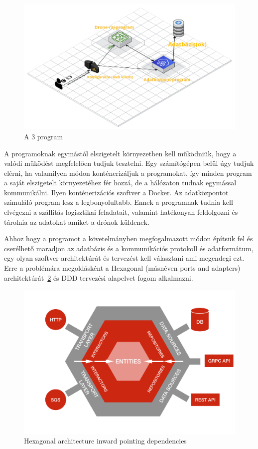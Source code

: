 \begin{figure}[h]
    \centering
    \includegraphics[scale=0.22]{images/szakdolgozat-3-program-abra.png}
    \caption{A 3 program}
    \label{fig:3program}
\end{figure}
A programoknak egymástól elszigetelt környezetben kell működniük, hogy a valódi működést megfelelően tudjuk tesztelni.
Egy számítógépen belül úgy tudjuk elérni, ha valamilyen módon konténerizáljuk a programokat, így minden program a saját elszigetelt környezetéhez fér hozzá, de a hálózaton tudnak egymással kommunikálni.
Ilyen konténerizációs szoftver a Docker.
Az adatközpontot szimuláló program lesz a legbonyolultabb.
Ennek a programnak tudnia kell elvégezni a szállítás logisztikai feladatait, valamint hatékonyan feldolgozni és tárolnia az adatokat amiket a drónok küldenek.


Ahhoz hogy a programot a követelmányben megfogalmazott módon építsük fel és cserélhető maradjon az adatbázis és a kommunikációs protokoll és adatformátum, egy olyan szoftver architektúrát és tervezést kell választani ami megendegi ezt.
Erre a problémára megoldásként a Hexagonal (másnéven ports and adapters) architektúrát~\ref{fig:hexagonal-inward} és DDD tervezési alapelvet fogom alkalmazni.
\begin{figure}[h]
    \centering
    \includegraphics[scale=0.07]{images/hexa-inward.png}
    \caption{Hexagonal architecture inward pointing dependencies \cite{netflix}}
    \label{fig:hexagonal-inward}
\end{figure}

